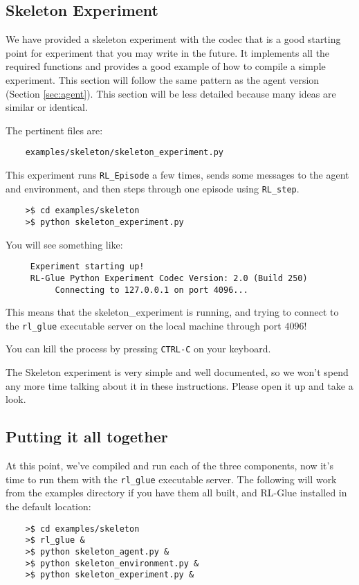 \documentclass[11pt]{article}
\begin{document}
\subsection{Skeleton Experiment}
We have provided a skeleton experiment with the codec that is a good starting point for experiment that you may write in the future.
It implements all the required functions and provides a good example of how to compile a simple experiment.  This section will follow the same 
pattern as the agent version (Section \ref{sec:agent}).  This section will be less detailed because many ideas are similar or identical.

The pertinent files are:
\begin{verbatim}
	examples/skeleton/skeleton_experiment.py
\end{verbatim}

This experiment runs \texttt{RL\_Episode} a few times, sends some messages to the agent and environment, and then steps through one episode using \texttt{RL\_step}.

\begin{verbatim}
	>$ cd examples/skeleton
	>$ python skeleton_experiment.py
\end{verbatim}

You will see something like:
\begin{verbatim}
     Experiment starting up!
     RL-Glue Python Experiment Codec Version: 2.0 (Build 250)
          Connecting to 127.0.0.1 on port 4096...
\end{verbatim}

This means that the skeleton\_experiment is running, and trying to connect to the \texttt{rl\_glue} executable server on the local machine through port $4096$!  

You can kill the process by pressing \texttt{CTRL-C} on your keyboard.


The Skeleton experiment is very simple and well documented, so we won't spend any more time talking about it in these instructions.
Please open it up and take a look.

\subsection{Putting it all together}
At this point, we've compiled and run each of the three components, now it's time to run them with the \texttt{rl\_glue} executable server.  The following will work from the examples 
directory if you have them all built, and RL-Glue installed in the default location:
\begin{verbatim}
	>$ cd examples/skeleton
	>$ rl_glue &
	>$ python skeleton_agent.py &
	>$ python skeleton_environment.py &
	>$ python skeleton_experiment.py &
\end{verbatim}
\end{document}
